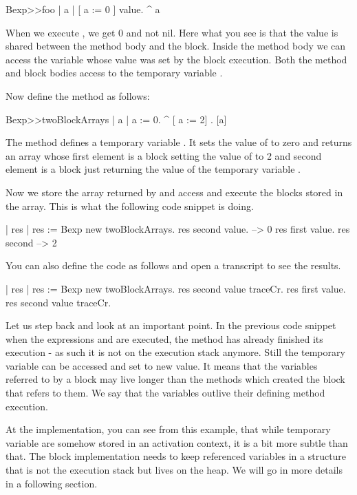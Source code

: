 \documentclass[a4paper,10pt,twoside]{book}
\begin{document}
\begin{code}{}
Bexp>>foo
	| a |
	[ a := 0 ] value.
	^ a
\end{code}

When we execute , we get 0 and not nil.
Here what you see is that the value is shared between the method body and the block. Inside the method body we can access the variable whose value was set by the block execution.
Both the method  and block bodies access to the temporary variable .

Now define the method  as follows:

\begin{code}{}
Bexp>>twoBlockArrays
	| a |
	a := 0.
	^ {[ a := 2] . [a]}
\end{code}

The method  defines a temporary variable . It sets the value of 
to zero and returns an array whose first element is a block setting the value of  to 2 and second element is a block just returning the value of the temporary variable .

Now we store the array returned by  and access and execute the blocks stored in the array. This is what the following code snippet is doing.

\begin{code}{}
| res |
res := Bexp new twoBlockArrays.
res second value.
     --> 0
res first value.
res second
     --> 2
\end{code}

You can also define the code as follows and open a transcript to see the results.

\begin{code}
| res |
res := Bexp new twoBlockArrays.
res second value traceCr.
res first value.
res second value traceCr.
\end{code}

Let us step back and look at an important point.
In the previous code snippet when the expressions  and  are executed, the method  has already finished its execution - as such it is not on the execution stack anymore.  Still the temporary variable  can be accessed and set to new value. It means that the variables referred to by a block may live longer than the methods which created the block that refers to them. We say that the variables outlive their defining method execution.

At the implementation, you can see from this example, that while temporary variable are somehow stored in an activation context, it is a bit more subtle than that. The block implementation needs to keep referenced variables in a structure that is not the execution stack but lives on the heap. We will go in more details in a following section.
\end{document}
